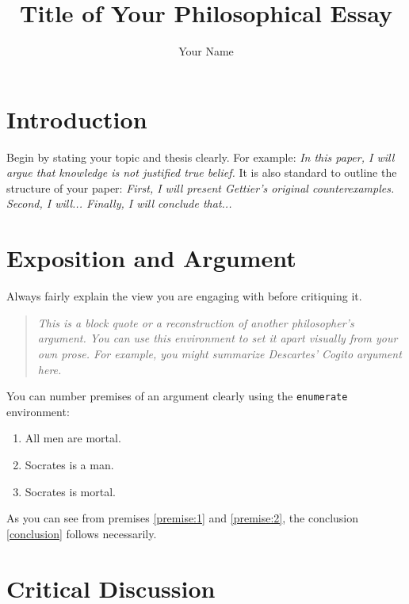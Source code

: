 \documentclass[11pt, a4paper]{article}
\title{Title of Your Philosophical Essay}
\author{Your Name}
\date{}
\newenvironment{argument}{\begin{quote}\itshape}{\end{quote}} %
\begin{document}
\maketitle


\section{Introduction}
\label{sec:introduction}

Begin by stating your topic and thesis clearly. For example: \textit{In this paper, I will argue that knowledge is not justified true belief.} It is also standard to outline the structure of your paper: \textit{First, I will present Gettier's original counterexamples. Second, I will... Finally, I will conclude that...}

\section{Exposition and Argument}
\label{sec:argument}

Always fairly explain the view you are engaging with before critiquing it.

\begin{argument}
    This is a block quote or a reconstruction of another philosopher's argument. You can use this environment to set it apart visually from your own prose. For example, you might summarize Descartes' Cogito argument here.
\end{argument}

You can number premises of an argument clearly using the \texttt{enumerate} environment:
\begin{enumerate}[label=(\arabic*)] %
    \item \label{premise:1} All men are mortal.
    \item \label{premise:2} Socrates is a man.
    \item[\therefore] \label{conclusion} Socrates is mortal. %
\end{enumerate}

As you can see from premises \ref{premise:1} and \ref{premise:2}, the conclusion \ref{conclusion} follows necessarily.

\section{Critical Discussion}
\label{sec:critical}
\end{document}
